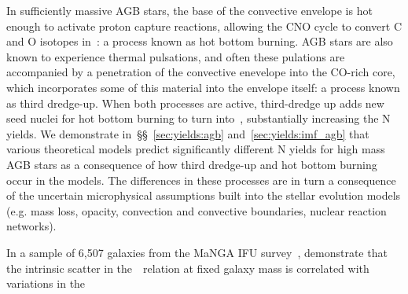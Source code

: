 \documentclass[ms.tex]{subfiles}
\begin{document}
In sufficiently massive AGB stars, the base of the convective envelope is hot
enough to activate proton capture reactions, allowing the CNO cycle to convert
C and O isotopes in~\Nfourteen: a process known as hot bottom burning.
AGB stars are also known to experience thermal pulsations, and often these
pulations are accompanied by a penetration of the convective enevelope into the
CO-rich core, which incorporates some of this material into the envelope
itself: a process known as third dredge-up.
When both processes are active, third-dredge up adds new seed nuclei for hot
bottom burning to turn into~\Nfourteen, substantially increasing the N yields.
We demonstrate in~\S\S~\ref{sec:yields:agb} and~\ref{sec:yields:imf_agb} that
various theoretical models predict significantly different N yields for high
mass AGB stars as a consequence of how third dredge-up and hot bottom burning
occur in the models.
The differences in these processes are in turn a consequence of the uncertain
microphysical assumptions built into the stellar evolution models (e.g. mass
loss, opacity, convection and convective boundaries, nuclear reaction networks).
\par
In a sample of 6,507 galaxies from the MaNGA IFU survey~\citep{Bundy2015},
\citet{Schaefer2020} demonstrate that the intrinsic scatter in
the~\ohno~relation at fixed galaxy mass is correlated with variations in the
\end{document}
